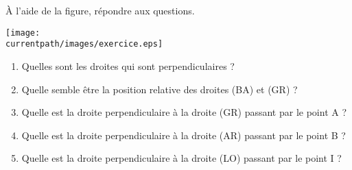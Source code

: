 \begin{exercice}
    À l'aide de la figure, répondre aux questions.
    \begin{center}
       \texttt{[image: \\currentpath/images/exercice.eps]}
    \end{center}
    \begin{enumerate}
       \item Quelles sont les droites qui sont perpendiculaires ?
       \item Quelle semble être la position relative des droites (BA) et (GR) ?
       \item Quelle est la droite perpendiculaire à la droite (GR) passant par le point A ?
       \item Quelle est la droite perpendiculaire à la droite (AR) passant par le point B ?
       \item Quelle est la droite perpendiculaire à la droite (LO) passant par le point I ?
    \end{enumerate}
 \end{exercice}
